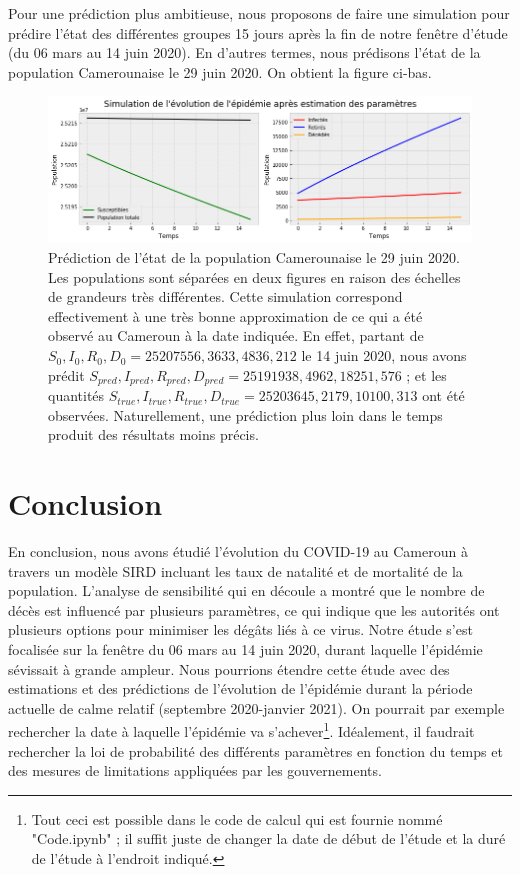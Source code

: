 \documentclass[
  french,
	10pt, %
]{fphw}
\begin{document}
Pour une prédiction plus ambitieuse, nous proposons de faire une simulation pour prédire l'état des différentes groupes 15 jours après la fin de notre fenêtre d'étude (du 06 mars au 14 juin 2020). En d'autres termes, nous prédisons l'état de la population Camerounaise le 29 juin 2020. On obtient la figure ci-bas.  
\begin{figure}[H]
  \centering
  \includegraphics[width=\linewidth]{predict.png}
  \caption{Prédiction de l'état de la population Camerounaise le 29 juin 2020. Les populations sont séparées en deux figures en raison des échelles de grandeurs très différentes. Cette simulation correspond effectivement à une très bonne approximation de ce qui a été observé au Cameroun à la date indiquée. En effet, partant de $S_0,I_0,R_0,D_0=25207556,3633,4836, 212$ le 14 juin 2020, nous avons prédit $S_{pred},I_{pred},R_{pred},D_{pred}=25191938,4962,18251,576$ ; et les quantités $S_{true},I_{true},R_{true},D_{true}=25203645,2179,10100,313$ ont été observées. Naturellement, une prédiction plus loin dans le temps produit des résultats moins précis.}
  \label{fig:predict}
\end{figure}

\section*{Conclusion}

En conclusion, nous avons étudié l'évolution du COVID-19 au Cameroun à travers un modèle SIRD incluant les taux de natalité et de mortalité de la population. L'analyse de sensibilité qui en découle a montré que le nombre de décès est influencé par plusieurs paramètres, ce qui indique que les autorités ont plusieurs options pour minimiser les dégâts liés à ce virus. Notre étude s'est focalisée sur la fenêtre du 06 mars au 14 juin 2020, durant laquelle l'épidémie sévissait à grande ampleur. Nous pourrions étendre cette étude avec des estimations et des prédictions de l'évolution de l'épidémie durant la période actuelle de calme relatif (septembre 2020-janvier 2021). On pourrait par exemple rechercher la date à laquelle l'épidémie va s'achever\footnote{Tout ceci est possible dans le code de calcul qui est fournie nommé "Code.ipynb" ; il suffit juste de changer la date de début de l'étude et la duré de l'étude à l'endroit indiqué.}. Idéalement, il faudrait rechercher la loi de probabilité des différents paramètres en fonction du temps et des mesures de limitations appliquées par les gouvernements.     
\end{document}
